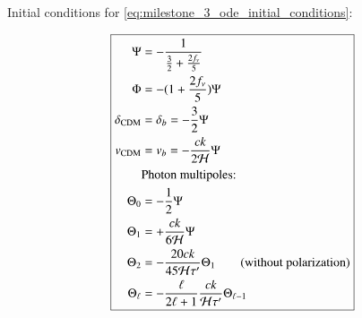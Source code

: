\begin{appendix}
Initial conditions for \ref{eq:milestone_3_ode_initial_conditions}:

\begin{equation}\label{eq:milestone_3_ode_initial_conditions}
\boxed{
\begin{aligned}
\Psi &= -\frac{1}{\frac{3}{2} + \frac{2f_\nu}{5}}\\
\Phi &= -(1+\frac{2f_\nu}{5})\Psi \\
\delta_{\rm CDM} &= \delta_b = -\frac{3}{2} \Psi \\
v_{\rm CDM} &= v_b = -\frac{ck}{2\mathcal{H}} \Psi\\
&\text{Photon multipoles:}\\
\Theta_0 &= -\frac{1}{2} \Psi \\
\Theta_1 &= +\frac{ck}{6\mathcal{H}}\Psi \\
\Theta_2 &= -\frac{20ck}{45\mathcal{H}\tau^\prime} \Theta_1 \quad\quad \textrm{(without polarization)} \\
\Theta_\ell &= -\frac{\ell}{2\ell+1} \frac{ck}{\mathcal{H}\tau^\prime} \Theta_{\ell-1}\\
\end{aligned}
}
\end{equation}

\end{appendix}
